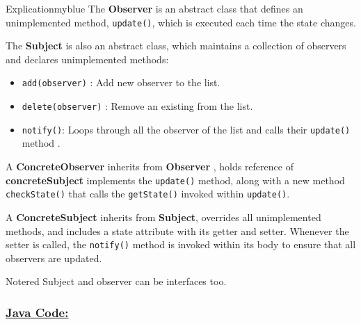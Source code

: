 \begin{prettyBox}{Explication}{myblue}
The \textbf{Observer} is an abstract class that defines an unimplemented method, \texttt{update()},
which is executed each time the state changes.

\vspace{0.25cm}
The \textbf{Subject} is also an abstract class,
which maintains a collection of observers and declares unimplemented methods:
\begin{itemize}
    \item  \texttt{add(observer)} : Add new observer to the list.
    \item \texttt{delete(observer)} : Remove an existing from the list.
    \item \texttt{notify()}: Loops through all the observer of the list and calls their \texttt{update()} method .
\end{itemize}

\vspace{0.25cm}
A \textbf{ConcreteObserver} inherits from \textbf{Observer} , holds reference of \textbf{concreteSubject} implements the 
\texttt{update()} method, along with a new method \texttt{checkState()} that calls the \texttt{getState()}
invoked within \texttt{update()}.

\vspace{0.25cm}
A \textbf{ConcreteSubject} inherits from \textbf{Subject}, overrides all unimplemented
methods, and includes a state attribute with its getter and setter. Whenever the setter is 
called, the \texttt{notify()} method is invoked within its body to ensure that all 
observers are updated.
\end{prettyBox}


\newpage

\begin{prettyBox}{Note}{red}
Subject and observer can be interfaces too.
\end{prettyBox}

\vspace{0.5cm}

\subsubsection*{\underline{Java Code:}}



\vspace{1cm}


